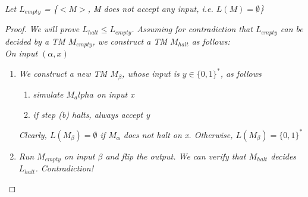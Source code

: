 \documentclass{article}
\begin{document}

\begin{lemma}
    \textit{Let $L_{empty}$ = \{$<M>$, M does not accept any input, i.e. $L(M) = \emptyset$\}}
    \begin{proof}
        \textit{We will prove $L_{halt}\leq L_{empty}$. Assuming for contradiction that $L_{empty}$ can be decided by a TM $M_{empty}$, we construct a TM $M_{halt}$ as follows:\\ On input $(\alpha,x)$}
        \begin{enumerate}
            \item \textit{We construct a new TM $M_\beta$, whose input is $y \in \{0,1\}^*$, as follows}
            \begin{enumerate}
                \item \textit{simulate $M_alpha$ on input x}
                \item \textit{if step (b) halts, always accept y}
            \end{enumerate}
            \textit{Clearly, $L(M_\beta) = \emptyset$ if $M_\alpha$ does not halt on x. Otherwise, $L(M_\beta) = \{0,1\}^*$}

            \item \textit{Run $M_{empty}$ on input $\beta$ and flip the output. We can verify that $M_{halt}$ decides $L_{halt}$. Contradiction!}
        \end{enumerate}
    \end{proof} 
\end{lemma}
\end{document}

